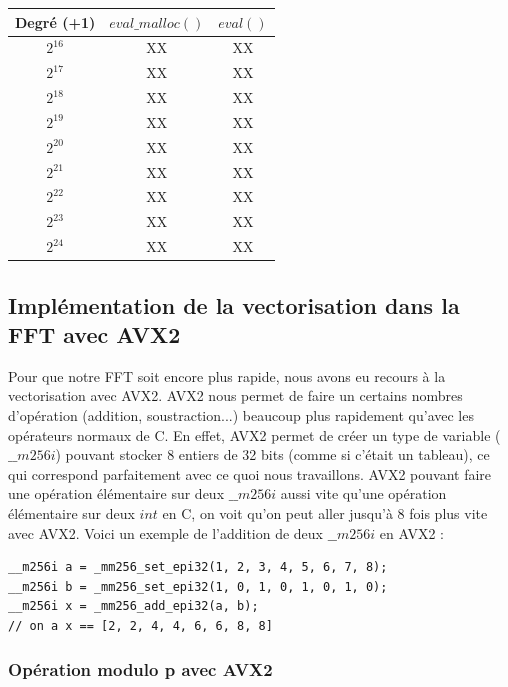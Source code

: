 \documentclass[12pt, a4paper]{article}
\begin{document}
\begin{center}
\begin{tabular}{||c c c||}
\hline
Degré (+1) & $eval\_malloc()$ & $eval()$ \\
\hline\hline
$2^{16}$ & XX & XX \\
\hline
$2^{17}$ & XX & XX \\
\hline
$2^{18}$ & XX & XX \\
\hline
$2^{19}$ & XX & XX \\
\hline
$2^{20}$ & XX & XX \\
\hline
$2^{21}$ & XX & XX \\
\hline
$2^{22}$ & XX & XX \\
\hline
$2^{23}$ & XX & XX \\
\hline
$2^{24}$ & XX & XX \\
\hline
\end{tabular}
\end{center}

\subsection{Implémentation de la vectorisation dans la FFT avec AVX2}

Pour que notre FFT soit encore plus rapide, nous avons eu recours à la vectorisation avec AVX2. AVX2 nous permet de faire un certains nombres d'opération (addition, soustraction...) beaucoup plus rapidement qu'avec les opérateurs normaux de C. En effet, AVX2 permet de créer un type de variable ($\_\_m256i$) pouvant stocker 8 entiers de 32 bits (comme si c'était un tableau), ce qui correspond parfaitement avec ce quoi nous travaillons. AVX2 pouvant faire une opération élémentaire sur deux $\_\_m256i$ aussi vite qu'une opération élémentaire sur deux $int$ en C, on voit qu'on peut aller jusqu'à 8 fois plus vite avec AVX2. Voici un exemple de l'addition de deux $\_\_m256i$ en AVX2 : 

\begin{lstlisting}
__m256i a = _mm256_set_epi32(1, 2, 3, 4, 5, 6, 7, 8);
__m256i b = _mm256_set_epi32(1, 0, 1, 0, 1, 0, 1, 0);
__m256i x = _mm256_add_epi32(a, b);
// on a x == [2, 2, 4, 4, 6, 6, 8, 8]
\end{lstlisting}

\subsubsection{Opération modulo p avec AVX2}
\end{document}
